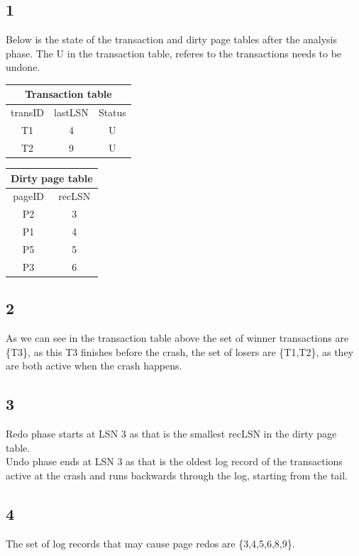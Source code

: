\documentclass{article}
\theoremstyle{plain}
\theoremstyle{nonumberplain}
\begin{document}
\subsection*{1}

Below is the state of the transaction and dirty page tables after the analysis phase.
The U in the transaction table, referes to the transactions needs to be undone.\\
\begin{tabular}{| c | c | c |}
	\hline
	\multicolumn{3}{|c|}{Transaction table} \\
	\hline
	transID & lastLSN & Status\\
	\hline
	T1 & 4 & U\\
	\hline
	T2 & 9 & U\\
	\hline
\end{tabular}
\begin{tabular}{| c | c |}
	\hline
	\multicolumn{2}{|c|}{Dirty page table} \\
	\hline
	pageID & recLSN \\
	\hline
	P2 & 3 \\
	\hline
	P1 & 4 \\
	\hline
	P5 & 5 \\
	\hline
	P3 & 6 \\
	\hline
\end{tabular}

\subsection*{2}

As we can see in the transaction table above the set of winner transactions are \{T3\}, as this T3 finishes before the crash, the set of losers are \{T1,T2\}, as they are both active when the crash happens.


\subsection*{3}
Redo phase starts at LSN 3 as that is the smallest recLSN in the dirty page table.\\
Undo phase ends at LSN 3 as that is the oldest log record of the transactions active at the crash and runs backwards through the log, starting from the tail.

\subsection*{4}
The set of log records that may cause page redos are \{3,4,5,6,8,9\}.
\end{document}
